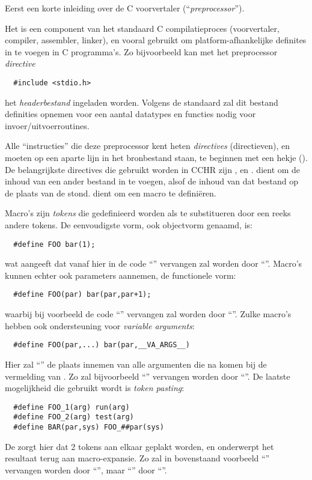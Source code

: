Eerst een korte inleiding over de C voorvertaler (``{\em preprocessor}'').

Het is een component van het standaard C compilatieproces (voorvertaler, compiler, assembler, linker), en vooral gebruikt om platform-afhankelijke definites in te voegen in C programma's. Zo bijvoorbeeld kan met het preprocessor {\em directive} \begin{Verbatim}
  #include <stdio.h>
\end{Verbatim}
het {\em headerbestand}  ingeladen worden. Volgens de standaard zal dit bestand definities opnemen voor een aantal datatypes en functies nodig voor invoer/uitvoerroutines. 

Alle ``instructies'' die deze preprocessor kent heten {\em directives} (directieven), en moeten op een aparte lijn in het bronbestand staan, te beginnen met een hekje (\code{\#}). De belangrijkste directives die gebruikt worden in CCHR zijn , en .  dient om de inhoud van een ander bestand in te voegen, alsof de inhoud van dat bestand op de plaats van de  stond.  dient om een macro te defini\"eren.

Macro's zijn {\em tokens} die gedefinieerd worden als te substitueren door een reeks andere tokens. De eenvoudigste vorm, ook objectvorm genaamd, is: \begin{Verbatim}
  #define FOO bar(1);
\end{Verbatim}
wat aangeeft dat vanaf hier in de code ``'' vervangen zal worden door ``''. Macro's kunnen echter ook parameters aannemen, de functionele vorm: \begin{Verbatim}
  #define FOO(par) bar(par,par+1);
\end{Verbatim}
waarbij bij voorbeeld de code ``'' vervangen zal worden door ``''. Zulke macro's hebben ook ondersteuning voor {\em variable arguments}: \begin{Verbatim}
  #define FOO(par,...) bar(par,__VA_ARGS__)
\end{Verbatim}
Hier zal ``'' de plaats innemen van alle argumenten die na  komen bij de vermelding van . Zo zal bijvoorbeeld ``'' vervangen worden door ``''. De laatste mogelijkheid die gebruikt wordt is {\em token pasting}: \begin{Verbatim}
  #define FOO_1(arg) run(arg)
  #define FOO_2(arg) test(arg)
  #define BAR(par,sys) FOO_##par(sys)
\end{Verbatim}
De \code{\#\#} zorgt hier dat 2 tokens aan elkaar geplakt worden, en onderwerpt het resultaat terug aan macro-expansie. Zo zal in bovenstaand voorbeeld ``'' vervangen worden door ``'', maar ``'' door ``''.

